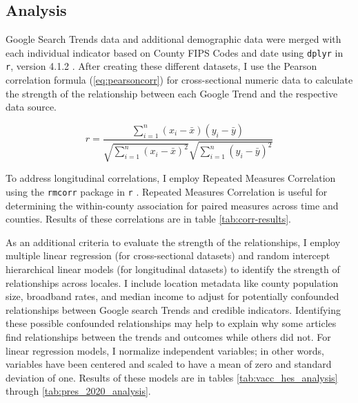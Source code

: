 
\subsection{Analysis}
Google Search Trends data and additional demographic data were merged with each
individual indicator based on County FIPS Codes and date using \texttt{dplyr} in \texttt{r},
version 4.1.2 \citep{tidyverse}. After creating these different datasets, I use the 
Pearson correlation formula (\eqref{eq:pearsoncorr}) for cross-sectional 
numeric data to calculate the strength of the relationship between each Google
Trend and the respective data source.

\begin{equation}
 r =
  \frac{ \sum_{i=1}^{n}(x_i-\bar{x})(y_i-\bar{y}) }{
        \sqrt{\sum_{i=1}^{n}(x_i-\bar{x})^2}\sqrt{\sum_{i=1}^{n}(y_i-\bar{y})^2}} \label{eq:pearsoncorr}
\end{equation}

To address longitudinal correlations, I employ Repeated Measures Correlation
using the \texttt{rmcorr} package in \texttt{r} \citep{bland1995, bakdash2017}. 
Repeated Measures Correlation is useful for determining the within-county
association for paired measures across time and counties. Results of these 
correlations are in table \ref{tab:corr-results}.

As an additional criteria to evaluate the strength of the relationships, 
I employ multiple linear regression
(for cross-sectional datasets) and random intercept hierarchical linear models
\citep{pinheiro_etal21} (for longitudinal datasets) to identify the strength of
relationships across locales.
I include location metadata like county population size,
broadband rates, and median income to adjust for potentially
confounded relationships between Google search Trends and credible
indicators. Identifying these possible confounded relationships may help to
explain why some articles find relationships between the trends and outcomes
while others did not.
For linear regression models, I normalize independent
variables; in other words, variables have been centered and scaled to have a mean of zero and
standard deviation of one. Results of these models are in tables \ref{tab:vacc_hes_analysis} through \ref{tab:pres_2020_analysis}.

